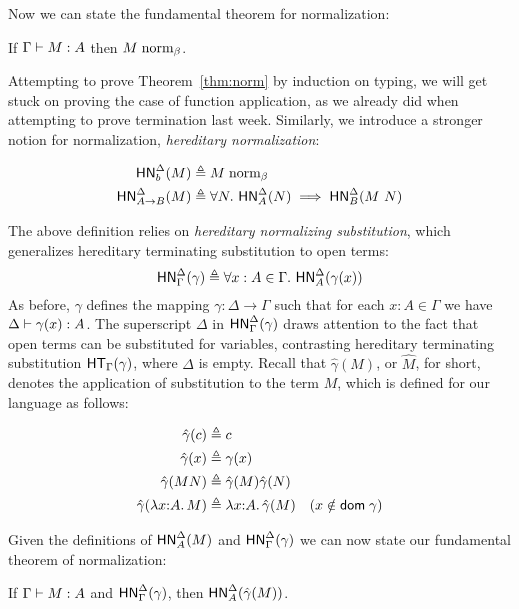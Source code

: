 \documentclass{article}
\begin{document}
Now we can state the fundamental theorem for normalization:
\begin{theorem}[Normalization]\label{thm:norm}
If $\Gamma \vdash M : A$ then $M \mathrel{\text{norm}_\beta}$.
\end{theorem}

Attempting to prove Theorem~\ref{thm:norm} by induction on typing, we will get stuck on proving
the case of function application, as we already did when attempting to prove termination last
week.  Similarly, we introduce a stronger notion for normalization, \emph{hereditary normalization}:

\begin{align*}
  \mathsf{HN}^{\Delta}_{b}(M) &\triangleq M \mathrel{\text{norm}_\beta}\\
  \mathsf{HN}^{\Delta}_{A \to B}(M) &\triangleq
  \forall N.\ \mathsf{HN}^{\Delta}_{A}(N) \implies \mathsf{HN}^{\Delta}_{B}(M\ N)
\end{align*}

The above definition relies on \emph{hereditary normalizing substitution}, which generalizes
hereditary terminating substitution to open terms:
\[
\mathsf{HN}^{\Delta}_{\Gamma}(\gamma) \triangleq \forall x : A \in \Gamma.\ \mathsf{HN}^{\Delta}_{A}(\gamma(x))
\]
As before, $\gamma$ defines the mapping $\gamma : \Delta \to \Gamma$ such that for each
$x : A \in \Gamma$ we have $\Delta \vdash \gamma(x) : A$.  The superscript $\Delta$ in
$\mathsf{HN}^{\Delta}_{\Gamma}(\gamma)$ draws attention to the fact that open terms can be substituted
for variables, contrasting hereditary terminating substitution $\mathsf{HT}_{\Gamma}(\gamma)$, where
$\Delta$ is empty.  Recall that $\hat{\gamma}(M)$, or $\hat{M}$, for short, denotes the application
of substitution to the term $M$, which is defined for our language as follows:

\begin{align*}
\hat{\gamma}(c) &\triangleq c\\
\hat{\gamma}(x) &\triangleq \gamma(x)\\
\hat{\gamma}(M N) &\triangleq \hat{\gamma}(M) \hat{\gamma}(N)\\
\hat{\gamma}(\lambda x {:} A.\, M) &\triangleq \lambda x {:} A.\, \hat{\gamma}(M) \quad (x \notin \mathsf{dom}\; \gamma)
\end{align*}

Given the definitions of $\mathsf{HN}^{\Delta}_{A}(M)$ and $\mathsf{HN}^{\Delta}_{\Gamma}(\gamma)$ we can now
state our fundamental theorem of normalization:

\begin{theorem}\label{thm:hnorm}
If $\Gamma \vdash M : A$ and $\mathsf{HN}^{\Delta}_{\Gamma}(\gamma)$, then $\mathsf{HN}^{\Delta}_{A}(\hat\gamma(M))$.
\end{theorem}
\end{document}
